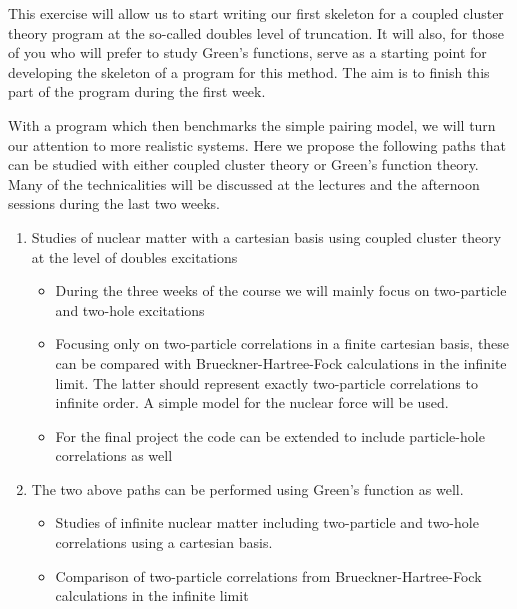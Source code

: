 \documentclass[%
twoside,                 %
final,                   %
10pt]{article}
\begin{document}
This exercise will allow us to start writing our first skeleton for a coupled cluster theory program at the so-called doubles level of truncation. It will also, for those of you who will prefer  to study Green's functions, serve as a 
starting point for developing the skeleton of a program for this method. The aim is to finish this part of the program during the first week.

With a program which then benchmarks the simple pairing model, we will turn our attention to more realistic systems.
Here we propose the following  paths that can be studied with either coupled cluster theory or Green's function theory. Many of the technicalities will be discussed at the lectures and the afternoon sessions during the last two weeks.   

\begin{enumerate}
\item Studies of nuclear matter with a cartesian basis using coupled cluster theory at the level of doubles excitations
\begin{itemize}

  \item During the three weeks of the course we will mainly focus on two-particle and two-hole excitations 

  \item Focusing only on two-particle correlations in a finite cartesian basis, these can be compared with Brueckner-Hartree-Fock calculations in the infinite limit. The latter should represent exactly two-particle correlations to infinite order. A simple model for the nuclear force will be used.

  \item For the final project the code can be extended to include particle-hole correlations as well

\end{itemize}

\noindent
\item The two above paths can be performed using Green's function as well.
\begin{itemize}

  \item Studies of infinite nuclear matter including two-particle and two-hole correlations using a cartesian basis.

  \item Comparison of two-particle correlations from Brueckner-Hartree-Fock calculations in the infinite limit
\end{itemize}

\noindent
\end{enumerate}
\end{document}
